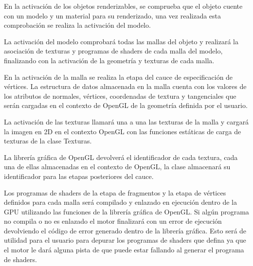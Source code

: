 \documentclass[a4paper, 17pt]{book}
\begin{document}
\vspace{1mm} %

En la activación de los objetos renderizables, se comprueba que el objeto cuente con un modelo y un material para su renderizado,
una vez realizada esta comprobación se realiza la activación del modelo. 

\vspace{1mm} %

La activación del modelo comprobará todas las mallas del objeto y realizará la asociación de texturas y programas de shaders de cada
malla del modelo, finalizando con la activación de la geometría y texturas de cada malla.

\vspace{1mm} %

En la activación de la malla se realiza la etapa del cauce de especificación de vértices. La estructura de datos almacenada en la malla
cuenta con los valores de los atributos de normales, vértices, coordenadas de textura y tangenciales que serán cargadas en el contexto
de OpenGL de la geometría definida por el usuario. 

\vspace{1mm} %

La activación de las texturas llamará una a una las texturas de la malla y cargará la imagen en 2D en el contexto OpenGL con las
funciones estáticas de carga de texturas de la clase Texturas. 

\vspace{1mm} %

La librería gráfica de OpenGL devolverá el identificador de cada textura, cada una de ellas almacenadas en el contexto de OpenGL,
la clase almacenará su identificador para las etapas posteriores del cauce.

\vspace{1mm} %

Los programas de shaders de la etapa de fragmentos y la etapa de vértices definidos para cada malla será compilado y enlazado en
ejecución dentro de la GPU utilizando las funciones de la librería gráfica de OpenGL. Si algún programa no compila o no es enlazado
el motor finalizará con un error de ejecución devolviendo el código de error generado dentro de la librería gráfica. Esto será de
utilidad para el usuario para depurar los programas de shaders que defina ya que el motor le dará alguna pista de que puede estar
fallando al generar el programa de shaders.
\end{document}
